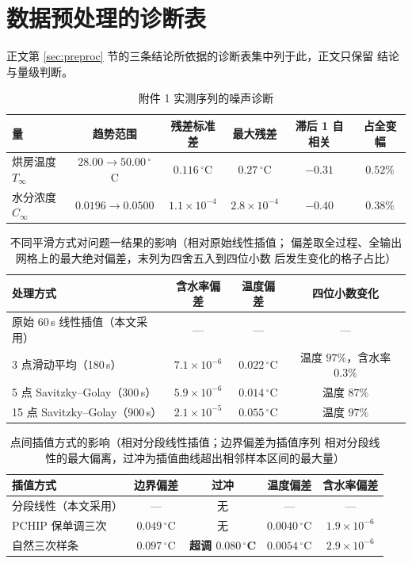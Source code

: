 \documentclass[12pt,a4paper,fontset=none]{ctexart}
\begin{document}
\section{数据预处理的诊断表}

正文第 \ref{sec:preproc} 节的三条结论所依据的诊断表集中列于此，正文只保留
结论与量级判断。

\begin{table}[htbp]
  \centering
  \caption{附件 1 实测序列的噪声诊断}
  \label{tab:noise}
  \small
  \begin{tabular}{lccccc}
    \toprule
    量 & 趋势范围 & 残差标准差 & 最大残差 & 滞后 1 自相关 & 占全变幅 \\
    \midrule
    烘房温度 $T_\infty$ & $28.00\to50.00\,^\circ$C & $0.116\,^\circ$C
      & $0.27\,^\circ$C & $-0.31$ & $0.52\%$ \\
    水分浓度 $C_\infty$ & $0.0196\to0.0500$ & $1.1\times10^{-4}$
      & $2.8\times10^{-4}$ & $-0.40$ & $0.38\%$ \\
    \bottomrule
  \end{tabular}
\end{table}

\begin{table}[htbp]
  \centering
  \caption{不同平滑方式对问题一结果的影响（相对原始线性插值；
    偏差取全过程、全输出网格上的最大绝对偏差，末列为四舍五入到四位小数
    后发生变化的格子占比）}
  \label{tab:smooth}
  \small
  \begin{tabular}{lccc}
    \toprule
    处理方式 & 含水率偏差 & 温度偏差 & 四位小数变化 \\
    \midrule
    原始 60\,s 线性插值（本文采用） & --- & --- & --- \\
    3 点滑动平均（180\,s） & $7.1\times10^{-6}$ & $0.022\,^\circ$C
      & 温度 $97\%$，含水率 $0.3\%$ \\
    5 点 Savitzky--Golay（300\,s） & $5.9\times10^{-6}$ & $0.014\,^\circ$C
      & 温度 $87\%$ \\
    15 点 Savitzky--Golay（900\,s） & $2.1\times10^{-5}$ & $0.055\,^\circ$C
      & 温度 $97\%$ \\
    \bottomrule
  \end{tabular}
\end{table}

\begin{table}[htbp]
  \centering
  \caption{点间插值方式的影响（相对分段线性插值；边界偏差为插值序列
    相对分段线性的最大偏离，过冲为插值曲线超出相邻样本区间的最大量）}
  \label{tab:interp}
  \small
  \begin{tabular}{lcccc}
    \toprule
    插值方式 & 边界偏差 & 过冲 & 温度偏差 & 含水率偏差 \\
    \midrule
    分段线性（本文采用） & --- & 无 & --- & --- \\
    PCHIP 保单调三次 & $0.049\,^\circ$C & 无
      & $0.0040\,^\circ$C & $1.9\times10^{-6}$ \\
    自然三次样条 & $0.097\,^\circ$C & \textbf{超调 $0.080\,^\circ$C}
      & $0.0054\,^\circ$C & $2.9\times10^{-6}$ \\
    \bottomrule
  \end{tabular}
\end{table}
\end{document}
